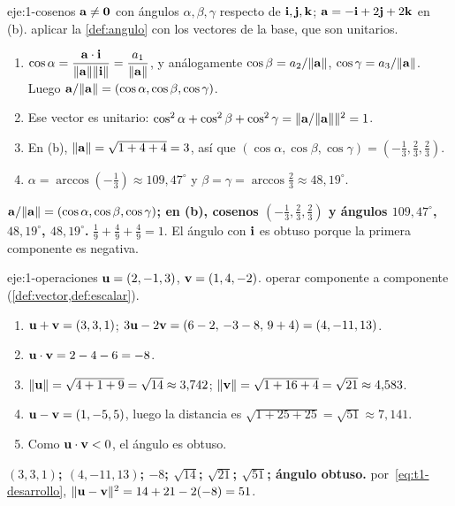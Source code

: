 \begin{solucion}{eje:1-cosenos}
\datos $\mathbf{a}\neq\mathbf{0}$ con ángulos $\alpha,\beta,\gamma$ respecto de $\mathbf{i},\mathbf{j},\mathbf{k}$; $\mathbf{a}=-\mathbf{i}+2\mathbf{j}+2\mathbf{k}$ en (b).
\planteamiento aplicar la \cref{def:angulo} con los vectores de la base, que son unitarios.
\pasos
\begin{enumerate}[label=\arabic*.]
  \item $\cos\alpha=\dfrac{\mathbf{a}\cdot\mathbf{i}}{\lVert\mathbf{a}\rVert\lVert\mathbf{i}\rVert}=\dfrac{a_1}{\lVert\mathbf{a}\rVert}$, y análogamente $\cos\beta=a_2/\lVert\mathbf{a}\rVert$, $\cos\gamma=a_3/\lVert\mathbf{a}\rVert$. Luego $\mathbf{a}/\lVert\mathbf{a}\rVert=(\cos\alpha,\cos\beta,\cos\gamma)$.
  \item Ese vector es unitario: $\cos^2\alpha+\cos^2\beta+\cos^2\gamma=\lVert\mathbf{a}/\lVert\mathbf{a}\rVert\rVert^2=1$.
  \item En (b), $\lVert\mathbf{a}\rVert=\sqrt{1+4+4}=3$, así que $(\cos\alpha,\cos\beta,\cos\gamma)=(-\tfrac13,\tfrac23,\tfrac23)$.
  \item $\alpha=\arccos(-\tfrac13)\approx109{,}47^\circ$ y $\beta=\gamma=\arccos\tfrac23\approx48{,}19^\circ$.
\end{enumerate}
\resultado \textbf{$\mathbf{a}/\lVert\mathbf{a}\rVert=(\cos\alpha,\cos\beta,\cos\gamma)$; en (b), cosenos $(-\frac13,\frac23,\frac23)$ y ángulos $109{,}47^\circ$, $48{,}19^\circ$, $48{,}19^\circ$.}
\comprobacion $\frac19+\frac49+\frac49=1$. El ángulo con $\mathbf{i}$ es obtuso porque la primera componente es negativa.
\end{solucion}

\begin{solucion}{eje:1-operaciones}
\datos $\mathbf{u}=(2,-1,3)$, $\mathbf{v}=(1,4,-2)$.
\planteamiento operar componente a componente (\cref{def:vector,def:escalar}).
\pasos
\begin{enumerate}[label=\arabic*.]
  \item $\mathbf{u}+\mathbf{v}=(3,3,1)$; $3\mathbf{u}-2\mathbf{v}=(6-2,\,-3-8,\,9+4)=(4,-11,13)$.
  \item $\mathbf{u}\cdot\mathbf{v}=2-4-6=-8$.
  \item $\lVert\mathbf{u}\rVert=\sqrt{4+1+9}=\sqrt{14}\approx3{,}742$; $\lVert\mathbf{v}\rVert=\sqrt{1+16+4}=\sqrt{21}\approx4{,}583$.
  \item $\mathbf{u}-\mathbf{v}=(1,-5,5)$, luego la distancia es $\sqrt{1+25+25}=\sqrt{51}\approx7{,}141$.
  \item Como $\mathbf{u}\cdot\mathbf{v}<0$, el ángulo es obtuso.
\end{enumerate}
\resultado \textbf{$(3,3,1)$; $(4,-11,13)$; $-8$; $\sqrt{14}$; $\sqrt{21}$; $\sqrt{51}$; ángulo obtuso.}
\comprobacion por~\eqref{eq:t1-desarrollo}, $\lVert\mathbf{u}-\mathbf{v}\rVert^2=14+21-2(-8)=51$.
\end{solucion}

